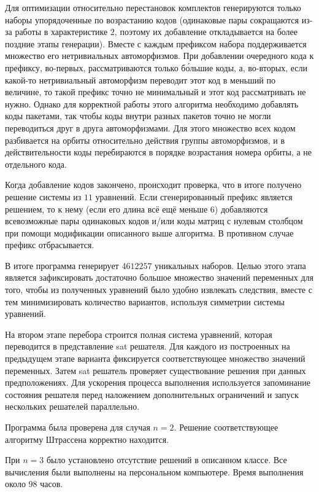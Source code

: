 \documentclass[12pt]{article}
\begin{document}
Для оптимизации относительно перестановок комплектов генерируются только наборы упорядоченные по возрастанию кодов (одинаковые пары сокращаются из-за работы в характеристике $2$, поэтому их добавление откладывается на более поздние этапы генерации). Вместе с каждым префиксом набора поддерживается множество его нетривиальных автоморфизмов. При добавлении очередного кода к префиксу, во-первых, рассматриваются только б\'{о}льшие коды, а, во-вторых, если какой-то нетривиальный автоморфизм переводит этот код в меньший по величине, то такой префикс точно не минимальный и этот код рассматривать не нужно. Однако для корректной работы этого алгоритма необходимо добавлять коды пакетами, так чтобы коды внутри разных пакетов точно не могли переводиться друг в друга автоморфизмами. Для этого множество всех кодом разбивается на орбиты относительно действия группы автоморфизмов, и в действительности коды перебираются в порядке возрастания номера орбиты, а не отдельного кода.

Когда добавление кодов закончено, происходит проверка, что в итоге получено решение системы из $11$ уравнений. Если сгенерированный префикс является решением, то к нему (если его длина всё ещё меньше $6$) добавляются всевозможные пары одинаковых кодов и/или коды матриц с нулевым столбцом при помощи модификации описанного выше алгоритма. В противном случае префикс отбрасывается.

В итоге программа генерирует $4612257$ уникальных наборов. Целью этого этапа является зафиксировать достаточно большое множество значений переменных для того, чтобы из полученных уравнений было удобно извлекать следствия, вместе с тем минимизировать количество вариантов, используя симметрии системы уравнений.

На втором этапе перебора строится полная система уравнений, которая переводится в представление sat решателя. Для каждого из построенных на предыдущем этапе варианта фиксируется соответствующее множество значений переменных. Затем sat решатель проверяет существование решения при данных предположениях. Для ускорения процесса выполнения используется запоминание состояния решателя перед наложением дополнительных ограничений и запуск нескольких решателей параллельно.

Программа была проверена для случая $n = 2$. Решение соответствующее алгоритму Штрассена корректно находится.

При $n = 3$ было установлено отсутствие решений в описанном классе. Все вычисления были выполнены на персональном компьютере. Время выполнения около $98$ часов. 
\end{document}
